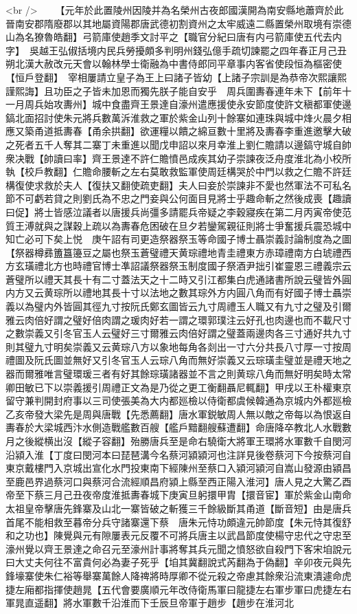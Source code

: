 <br />
　　【元年於此置陵州因陵并為名榮州古夜郎國漢開為南安縣地蕭齊於此晉南安郡隋廢郡以其地屬資陽郡唐武德初割資州之太牢威遠二縣置榮州取境有崇德山為名獠魯皓翻】弓箭庫使趙季文討平之【職官分紀曰唐有内弓箭庫使五代去内字】　吳越王弘俶括境内民兵勞擾頗多判明州錢弘億手疏切諫罷之四年春正月己丑朔北漢大赦改元天會以翰林學士衛融為中書侍郎同平章事内客省使段恒為樞密使【恒戶登翻】　宰相屢請立皇子為王上曰諸子皆幼【上諸子宗訓是為恭帝次熙讓熙謹熙誨】且功臣之子皆未加恩而獨先朕子能自安乎　周兵圍夀春連年未下【前年十一月周兵始攻夀州】城中食盡齊王景達自濠州遣應援使永安節度使許文稹都軍使邊鎬北面招討使朱元將兵數萬泝淮救之軍於紫金山列十餘寨如連珠與城中烽火晨夕相應又築甬道抵夀春【甬余拱翻】欲運糧以饋之綿亘數十里將及夀春李重進邀擊大破之死者五千人奪其二寨丁未重進以聞戊申詔以來月幸淮上劉仁贍請以邊鎬守城自帥衆决戰【帥讀曰率】齊王景達不許仁贍憤邑成疾其幼子崇諫夜泛舟度淮北為小校所執【校戶教翻】仁贍命腰斬之左右莫敢救監軍使周廷構哭於中門以救之仁贍不許廷構復使求救於夫人【復扶又翻使疏吏翻】夫人曰妾於崇諫非不愛也然軍法不可私名節不可虧若貸之則劉氏為不忠之門妾與公何面目見將士乎趣命斬之然後成喪【趣讀曰促】將士皆感泣議者以唐援兵尚彊多請罷兵帝疑之李穀寢疾在第二月丙寅帝使范質王溥就與之謀穀上疏以為夀春危困破在旦夕若鑾駕親征則將士爭奮援兵震恐城中知亡必可下矣上悦　庚午詔有司更造祭器祭玉等命國子博士聶崇義討論制度為之圖【祭器樽彞簠簋籩豆之屬也祭玉蒼璧禮天黄琮禮地青圭禮東方赤璋禮南方白琥禮西方玄璜禮北方也時禮官博士凖詔議祭器祭玉制度國子祭酒尹拙引崔靈恩三禮義宗云蒼璧所以禮天其長十有二寸蓋法天之十二時又引江都集白虎通諸書所說云璧皆外圓内方又云黄琮所以禮地其長十寸以法地之數其琮外方内圓八角而有好國子博士聶崇義以為璧内外皆圓其徑九寸按阮氏鄭玄圖皆云九寸周禮玉人職又有九寸之璧及引爾雅云肉倍好謂之璧好倍肉謂之瑗肉好若一謂之環郭璞注云好孔也肉邊也而不載尺寸之數崇義又引冬官玉人云璧好三寸爾雅云肉倍好謂之璧蓋兩邊肉各三寸通好共九寸則其璧九寸明矣崇義又云黄琮八方以象地每角各剡出一寸六分共長八寸厚一寸按周禮圖及阮氏圖並無好又引冬官玉人云琮八角而無好崇義又云琮璜圭璧並是禮天地之器而爾雅唯言璧環瑗三者有好其餘琮璜諸器並不言之則黄琮八角而無好明矣時太常卿田敏已下以崇義援引周禮正文為是乃從之更工衡翻聶尼輒翻】甲戌以王朴權東京留守兼判開封府事以三司使張美為大内都廵檢以侍衛都虞候韓通為京城内外都廵檢乙亥帝發大梁先是周與唐戰【先悉薦翻】唐水軍鋭敏周人無以敵之帝每以為恨返自夀春於大梁城西汴水側造戰艦數百艘【艦戶黯翻艘蘇遭翻】命唐降卒教北人水戰數月之後縱横出沒【縱子容翻】殆勝唐兵至是命右驍衛大將軍王環將水軍數千自閔河沿潁入淮【丁度曰閔河本曰琵琶溝今名蔡河潁潁河也注詳見後卷蔡河下今按蔡河自東京戴樓門入京城出宣化水門投東南下經陳州至蔡口入潁河潁河自嵩山發源由潁昌至鹿邑界過蔡河口與蔡河合流經順昌府潁上縣至西正陽入淮河】唐人見之大驚乙酉帝至下蔡三月己丑夜帝度淮抵夀春城下庚寅旦躬擐甲胄【擐音宦】軍於紫金山南命太祖皇帝擊唐先鋒寨及山北一寨皆破之斬獲三千餘級斷其甬道【斷音短】由是唐兵首尾不能相救至暮帝分兵守諸寨還下蔡　唐朱元恃功頗違元帥節度【朱元恃其復舒和之功也】陳覺與元有隙屢表元反覆不可將兵唐主以武昌節度使楊守忠代之守忠至濠州覺以齊王景達之命召元至濠州計事將奪其兵元聞之憤怒欲自殺門下客宋垍說元曰大丈夫何往不富貴何必為妻子死乎【垍其冀翻說式芮翻為于偽翻】辛卯夜元與先鋒壕寨使朱仁裕等舉寨萬餘人降禆將時厚卿不從元殺之帝慮其餘衆沿流東潰遽命虎捷左廂都指揮使趙晁【五代會要廣順元年改侍衛馬軍曰龍捷左右軍步軍曰虎捷左右軍晁直遥翻】將水軍數千沿淮而下壬辰旦帝軍于趙步【趙步在淮河北